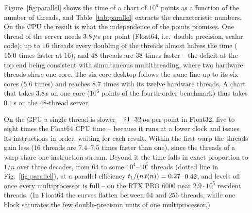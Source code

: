 \begin{table}[tb]
  \centering
  \caption{The quantities behind Fig.~\ref{fig:parallel}: the cost of one point
  on one thread ($64\times64$ chart), the per-point cost of the saturated device
  ($2048\times2048$ chart, work-queue schedule), and their ratio, the
  \emph{effective parallelism} $P_{\mathrm{eff}}=t_1/t_{\mathrm{sat}}$.
  $^\ast$For the GPUs in Float32, $P_{\mathrm{eff}}$ divided by the number of
  CUDA cores. With one thread per point instead of the work queue the GPUs are
  $1.3$--$1.9$ times faster (Table~\ref{tab:gpu}).}\label{tab:parallel}
\end{table}

Figure~\ref{fig:parallel} shows the time of a chart of $10^{6}$ points as a
function of the number of threads, and Table~\ref{tab:parallel} extracts the
characteristic numbers. On the CPU the result is what the independence of the
points promises. One thread of the server needs $3.8\,\mu$s per point
(Float64, i.e.\ double precision, scalar code); up to $16$ threads every doubling of the threads
almost halves the time ($15.0$ times faster at $16$), and
$48$ threads are $38$ times faster -- the deficit at the
top end being consistent with simultaneous multithreading, where two hardware
threads share one core. The six-core desktop follows the same line up to its
six cores ($5.6$ times) and reaches $8.7$ times with its twelve hardware
threads. A chart that takes $3.8$\,s on one core ($10^{6}$ points of the
fourth-order benchmark) thus takes $0.1$\,s on the $48$-thread server.

On the GPU a single thread is slower --
$21$--$32\,\mu$s per point in Float32, five to
eight times the Float64 CPU time -- because it runs at a lower clock and
issues its instructions in order, waiting for each result. Within the first
warp the threads gain less ($16$ threads are $7.4$--$7.5$ times faster than
one), since the threads of a warp share one instruction stream. Beyond it the
time falls in exact proportion to $1/n$ over three decades, from $64$ to some
$10^{4}$--$10^{5}$ threads (dotted line in Fig.~\ref{fig:parallel}), at a
parallel efficiency $t_1/(n\,t(n))=0.27$--$0.42$, and levels
off once every multiprocessor is full -- on the RTX PRO 6000 near
$2.9\cdot10^{5}$ resident threads. (In Float64 the curves flatten between $64$
and $256$ threads, while one block saturates the few double-precision units of
one multiprocessor.)

